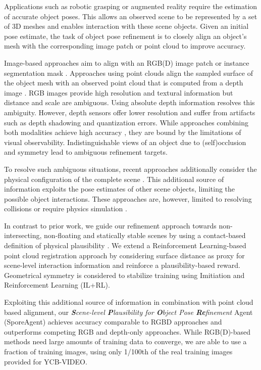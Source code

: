 \documentclass[10pt,twocolumn,letterpaper]{article}
\begin{document}
Applications such as robotic grasping or augmented reality require the estimation of accurate object poses. This allows an observed scene to be represented by a set of 3D meshes and enables interaction with these scene objects. Given an initial pose estimate, the task of object pose refinement is to closely align an object's mesh with the corresponding image patch or point cloud to improve accuracy. 

Image-based approaches aim to align with an RGB(D) image patch or instance segmentation mask \cite{li2018deepim,zakharov2019dpod,shao2020pfrl,busam2020moveit}. Approaches using point clouds align the sampled surface of the object mesh with an observed point cloud that is computed from a depth image \cite{besl1992icp}. RGB images provide high resolution and textural information but distance and scale are ambiguous. Using absolute depth information resolves this ambiguity. However, depth sensors offer lower resolution and suffer from artifacts such as depth shadowing and quantization errors. While approaches combining both modalities achieve high accuracy \cite{li2018deepim,deng2021poserbpf,wang2019densefusion}, they are bound by the limitations of visual observability. \mbox{Indistinguishable} views of an object due to (self)occlusion and symmetry lead to ambiguous refinement targets.

To resolve such ambiguous situations, recent approaches additionally consider the physical configuration of the complete scene \cite{wada2020morefusion,mitash2018mcts,bauer2020verefine}. This additional source of information exploits the pose estimates of other scene objects, limiting the possible object interactions. These approaches are, however, limited to resolving collisions \cite{wada2020morefusion} or require physics simulation \cite{mitash2018mcts,bauer2020verefine}.

In contrast to prior work, we guide our refinement approach towards non-intersecting, non-floating and statically stable scenes by using a contact-based definition of physical plausibility \cite{bauer2020eccvw}. We extend a Reinforcement Learning-based point cloud registration approach \cite{bauer2021reagent} by considering surface distance as proxy for scene-level interaction information and reinforce a plausibility-based reward. Geometrical symmetry is considered to stabilize training using Imitiation and Reinforcement Learning (IL+RL).

Exploiting this additional source of information in combination with point cloud based alignment, our \textit{\textbf{S}cene-level \textbf{P}lausibility for \textbf{O}bject Pose \textbf{Re}finement} Agent (SporeAgent) achieves accuracy comparable to RGBD \mbox{approaches} and outperforms competing RGB and depth-only approaches. While RGB(D)-based methods need large amounts of training data to converge, we are able to use a fraction of training images, using only 1/100th of the real training images provided for YCB-VIDEO.
\end{document}
